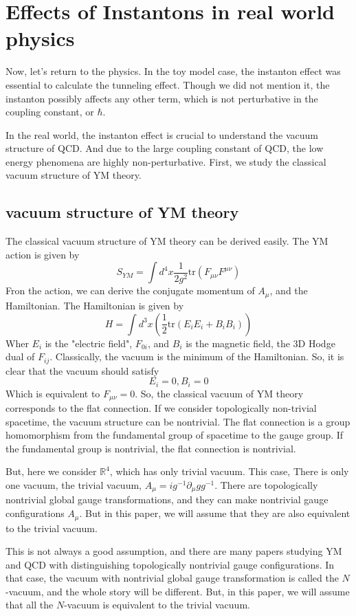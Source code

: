 \documentclass{article}
\begin{document}
\section{Effects of Instantons in real world physics}
Now, let's return to the physics. 
In the toy model case, the instanton effect was essential to calculate the tunneling effect. 
Though we did not mention it, the instanton possibly affects any other term, which is not perturbative in the coupling constant, or $\hbar$.

In the real world, the instanton effect is crucial to understand the vacuum structure of QCD.
And due to the large coupling constant of QCD, the low energy phenomena are highly non-perturbative.
First, we study the classical vacuum structure of YM theory.

\subsection{vacuum structure of YM theory}
The classical vacuum structure of YM theory can be derived easily.
The YM action is given by
\[
    S_{YM} = \int d^4 x \frac{1}{2g^2} \mathrm{tr}(F_{\mu\nu}F^{\mu\nu})
\]
Fron the action, we can derive the conjugate momentum of $A_\mu$, and the Hamiltonian.
The Hamiltonian is given by
\[
    H = \int d^3 x \left( \frac{1}{2} \mathrm{tr}(E_i E_i + B_i B_i)  \right)
\]
Wher $E_i$ is the "electric field", $F_{0i}$, and $B_i$ is the magnetic field, the 3D Hodge dual of $F_{ij}$.
Classically, the vacuum is the minimum of the Hamiltonian. So, it is clear that the vacuum should satisfy
\[
    E_i = 0, B_i = 0
\]
Which is equivalent to $F_{\mu\nu} = 0$.
So, the classical vacuum of YM theory corresponds to the flat connection.
If we consider topologically non-trivial spacetime, the vacuum structure can be nontrivial.
The flat connection is a group homomorphism from the fundamental group of spacetime to the gauge group.
If the fundamental group is nontrivial, the flat connection is nontrivial.

But, here we consider $\mathbb{R}^4$, which has only trivial vacuum.
This case, There is only one vacuum, the trivial vacuum, $A_\mu = i g^{-1} \partial_\mu g g^{-1}$.
There are topologically nontrivial global gauge transformations, and they can make nontrivial gauge configurations $A_\mu$.
But in this paper, we will assume that they are also equivalent to the trivial vacuum.

This is not always a good assumption, and there are many papers studying YM and QCD with distinguishing topologically nontrivial gauge configurations.
In that case, the vacuum with nontrivial global gauge transformation is called the $N$-vacuum, and the whole story will be different.
But, in this paper, we will assume that all the $N$-vacuum is equivalent to the trivial vacuum.
\end{document}
